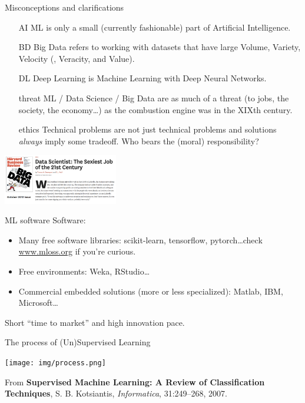 \documentclass{beamer}
\begin{document}
\begin{frame}{Misconceptions and clarifications}
\begin{itemize}
\item[AI] ML is only a small (currently fashionable) part of Artificial Intelligence.
\item[BD] Big Data refers to working with datasets that have large Volume, Variety, Velocity (, Veracity, and Value).
\item[DL] Deep Learning is Machine Learning with Deep Neural Networks.
\item[threat] ML / Data Science / Big Data are as much of a threat (to jobs, the society, the economy\ldots) as the combustion engine was in the XIXth century.
\item[ethics] Technical problems are not just technical problems and solutions \emph{always} imply some tradeoff. Who bears the (moral) responsibility?
\end{itemize}
\begin{center}
	\includegraphics[width=5cm]{img/datascientist.png}
\end{center}
\end{frame}

\begin{frame}{ML software}
Software:
\begin{itemize}
\item Many free software libraries: scikit-learn, tensorflow, pytorch\ldots check \url{www.mloss.org} if you're curious.
\item Free environments: Weka, RStudio\ldots
\item Commercial embedded solutions (more or less specialized): Matlab, IBM, Microsoft\ldots
\end{itemize}
\vspace{2em}
Short ``time to market'' and high innovation pace.
\end{frame}

\begin{frame}{The process of (Un)Supervised Learning}
\begin{center}
\texttt{[image: img/process.png]}
\end{center}
\vspace{-0.5cm}
{\footnotesize From \textbf{Supervised Machine Learning: A Review of Classification Techniques}, S. B. Kotsiantis, \textit{Informatica}, 31:249--268, 2007.}
\end{frame}
\end{document}
